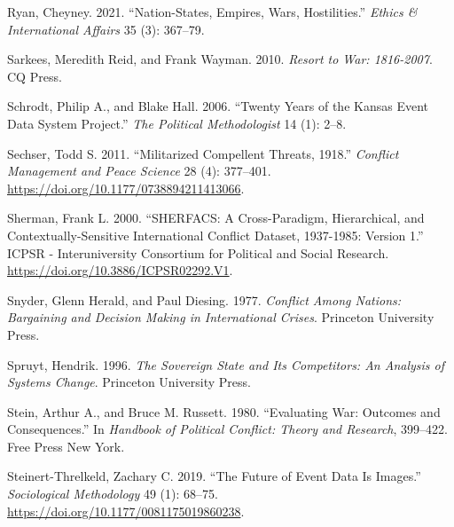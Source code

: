 \documentclass{article}
\newlength{\cslhangindent}
\newlength{\cslentryspacingunit} %
\newenvironment{CSLReferences}[2] %
 {%
  \setlength{\parindent}{0pt}
  \ifodd #1
  \let\oldpar\par
  \def\par{\hangindent=\cslhangindent\oldpar}
  \fi
  \setlength{\parskip}{#2\cslentryspacingunit}
 }%
 {}
\begin{document}
\begin{CSLReferences}{1}{0}
\leavevmode{}%
Ryan, Cheyney. 2021. {``Nation-{States}, {Empires}, {Wars},
{Hostilities}.''} \emph{Ethics \& International Affairs} 35 (3):
367--79.

\leavevmode{}%
Sarkees, Meredith Reid, and Frank Wayman. 2010. \emph{Resort to War:
1816-2007}. {CQ Press}.

\leavevmode{}%
Schrodt, Philip A., and Blake Hall. 2006. {``Twenty Years of the
{Kansas} Event Data System Project.''} \emph{The Political
Methodologist} 14 (1): 2--8.

\leavevmode{}%
Sechser, Todd S. 2011. {``Militarized {Compellent Threats},
1918.''} \emph{Conflict Management and Peace Science} 28
(4): 377--401. \url{https://doi.org/10.1177/0738894211413066}.

\leavevmode{}%
Sherman, Frank L. 2000. {``{SHERFACS}: {A Cross-Paradigm},
{Hierarchical}, and {Contextually-Sensitive International Conflict
Dataset}, 1937-1985: {Version} 1.''} {ICPSR - Interuniversity Consortium
for Political and Social Research}.
\url{https://doi.org/10.3886/ICPSR02292.V1}.

\leavevmode{}%
Snyder, Glenn Herald, and Paul Diesing. 1977. \emph{Conflict Among
Nations: {Bargaining} and Decision Making in International Crises}.
{Princeton University Press}.

\leavevmode{}%
Spruyt, Hendrik. 1996. \emph{The {Sovereign State} and {Its
Competitors}: {An Analysis} of {Systems Change}}. {Princeton University
Press}.

\leavevmode{}%
Stein, Arthur A., and Bruce M. Russett. 1980. {``Evaluating War:
{Outcomes} and Consequences.''} In \emph{Handbook of Political Conflict:
Theory and Research}, 399--422. {Free Press New York}.

\leavevmode{}%
Steinert-Threlkeld, Zachary C. 2019. {``The {Future} of {Event Data Is
Images}.''} \emph{Sociological Methodology} 49 (1): 68--75.
\url{https://doi.org/10.1177/0081175019860238}.


\end{CSLReferences}
\end{document}
